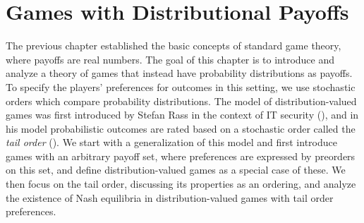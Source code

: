 \documentclass[a4paper]{scrreprt}
\theoremstyle{definition}
\begin{document}
    \chapter{Games with Distributional Payoffs}
    The previous chapter established the basic concepts of standard game theory, where payoffs are real numbers.
    The goal of this chapter is to introduce and analyze a theory of games that instead have probability distributions as payoffs.
    To specify the players' preferences for outcomes in this setting, we use stochastic orders which compare probability distributions.
    The model of distribution-valued games was first introduced by Stefan Rass
    in the context of IT security (\cite{bib:rassGameRiskManagI,bib:rassGameRiskManagII,bib:rassGameRiskManagIII}), and in his model probabilistic outcomes are rated based on a stochastic order called the \emph{tail order} (\cite{bib:rassTotalOrderingOnLossDistributions}).
    We start with a generalization of this model and first introduce games with an arbitrary payoff set, where preferences are expressed by preorders on this set, and define distribution-valued games as a special case of these.
    We then focus on the tail order, discussing its properties as an ordering, and analyze the existence of Nash equilibria in distribution-valued games with tail order preferences.
    
\end{document}
